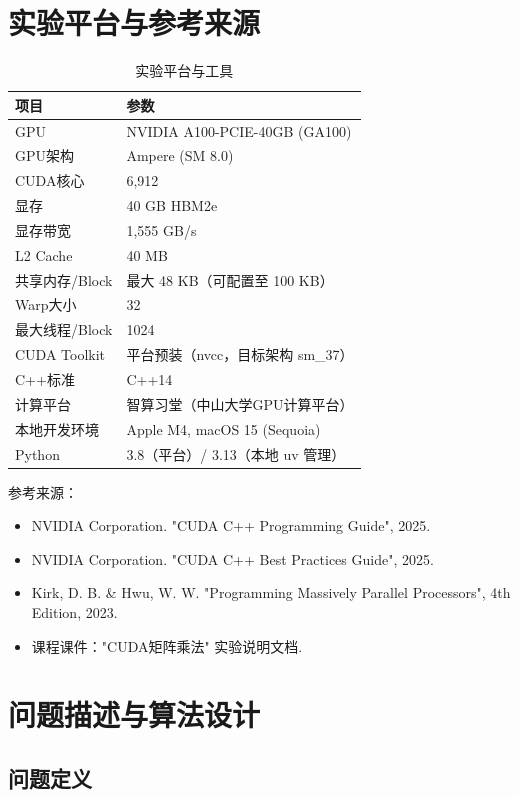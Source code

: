\documentclass[UTF8,a4paper,12pt,fontset=none]{ctexart}
\begin{document}
\section{实验平台与参考来源}

\begin{table}[H]
  \centering
  \caption{实验平台与工具}
  \label{tab:platform}
  \begin{tabular}{ll}
    \toprule
    项目 & 参数 \\
    \midrule
    GPU & NVIDIA A100-PCIE-40GB (GA100) \\
    GPU架构 & Ampere (SM 8.0) \\
    CUDA核心 & 6,912 \\
    显存 & 40 GB HBM2e \\
    显存带宽 & 1,555 GB/s \\
    L2 Cache & 40 MB \\
    共享内存/Block & 最大 48 KB（可配置至 100 KB） \\
    Warp大小 & 32 \\
    最大线程/Block & 1024 \\
    \midrule
    CUDA Toolkit & 平台预装（nvcc，目标架构 sm\_37）\\
    C++标准 & C++14 \\
    计算平台 & 智算习堂（中山大学GPU计算平台） \\
    \midrule
    本地开发环境 & Apple M4, macOS 15 (Sequoia) \\
    Python & 3.8（平台）/ 3.13（本地 uv 管理） \\
    \bottomrule
  \end{tabular}
\end{table}

参考来源：
\begin{itemize}
  \item NVIDIA Corporation. "CUDA C++ Programming Guide", 2025.
  \item NVIDIA Corporation. "CUDA C++ Best Practices Guide", 2025.
  \item Kirk, D. B. \& Hwu, W. W. "Programming Massively Parallel Processors", 4th Edition, 2023.
  \item 课程课件："CUDA矩阵乘法" 实验说明文档.
\end{itemize}

\section{问题描述与算法设计}

\subsection{问题定义}
\end{document}

